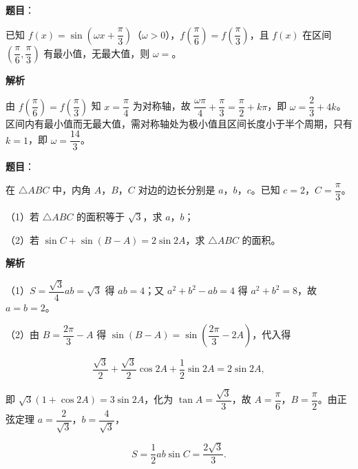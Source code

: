 \begin{answer}

\textbf{题目}：

已知 $f(x)=\sin\left(\omega x+\dfrac{\pi}{3}\right)$（$\omega>0$），$f\left(\dfrac{\pi}{6}\right)=f\left(\dfrac{\pi}{3}\right)$，且 $f(x)$ 在区间 $\left(\dfrac{\pi}{6},\dfrac{\pi}{3}\right)$ 有最小值，无最大值，则 $\omega=$\gkblank{}。

\textbf{解析}

由 $f\left(\dfrac{\pi}6\right)=f\left(\dfrac{\pi}3\right)$ 知 $x=\dfrac{\pi}4$ 为对称轴，故 $\dfrac{\omega\pi}4+\dfrac{\pi}3=\dfrac{\pi}2+k\pi$，即 $\omega=\dfrac23+4k$。区间内有最小值而无最大值，需对称轴处为极小值且区间长度小于半个周期，只有 $k=1$，即 $\omega=\dfrac{14}3$。


\end{answer}
\begin{answer}

\textbf{题目}：

在 $\triangle ABC$ 中，内角 $A$，$B$，$C$ 对边的边长分别是 $a$，$b$，$c$。已知 $c=2$，$C=\dfrac{\pi}{3}$。

（1）若 $\triangle ABC$ 的面积等于 $\sqrt3$，求 $a$，$b$；

（2）若 $\sin C+\sin(B-A)=2\sin2A$，求 $\triangle ABC$ 的面积。

\textbf{解析}

（1）$S=\dfrac{\sqrt3}4ab=\sqrt3$ 得 $ab=4$；又 $a^2+b^2-ab=4$ 得 $a^2+b^2=8$，故 $a=b=2$。

（2）由 $B=\dfrac{2\pi}3-A$ 得 $\sin(B-A)=\sin\left(\dfrac{2\pi}3-2A\right)$，代入得

\nopagebreak[4]
\[\frac{\sqrt3}2+\frac{\sqrt3}2\cos2A+\frac12\sin2A=2\sin2A,\]

即 $\sqrt3(1+\cos2A)=3\sin2A$，化为 $\tan A=\dfrac{\sqrt3}3$，故 $A=\dfrac{\pi}6$，$B=\dfrac{\pi}2$。由正弦定理 $a=\dfrac{2}{\sqrt3}$，$b=\dfrac{4}{\sqrt3}$，

\nopagebreak[4]
\[S=\frac12ab\sin C=\frac{2\sqrt3}3.\]


\end{answer}
